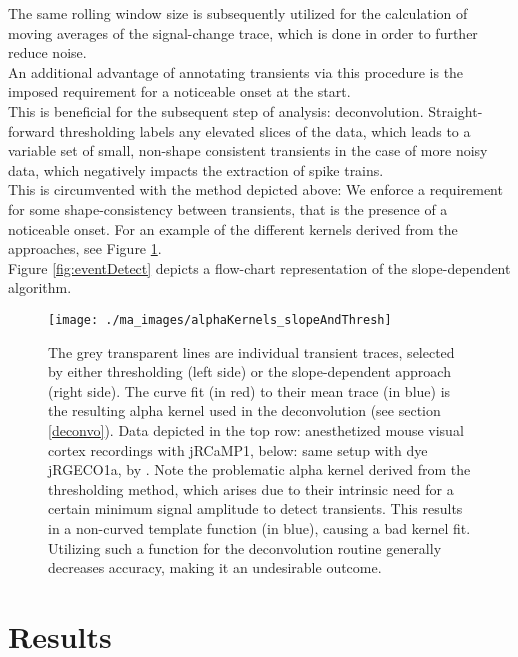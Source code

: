 \documentclass[titlepage]{article}
\begin{document}
The same rolling window size is subsequently utilized for the calculation of moving averages of the signal-change trace, which is done in order to further reduce noise.\\
An additional advantage of annotating transients via this procedure is the imposed requirement for a noticeable onset at the start.\\
This is beneficial for the subsequent step of analysis: deconvolution.
Straight-forward thresholding labels any elevated slices of the data, which leads to a variable set of small, non-shape consistent transients in the case of more noisy data, which negatively impacts the extraction of spike trains.\\
This is circumvented with the method depicted above: We enforce a requirement for some shape-consistency between transients, that is the presence of a noticeable onset. For an example of the different kernels derived from the approaches, see Figure \ref{fig:alphaKernels_slopeAndThresh}.\\
Figure \ref{fig:eventDetect} depicts a flow-chart representation of the slope-dependent algorithm.
\begin{figure}[h]
\centering
\texttt{[image: ./ma\_images/alphaKernels\_slopeAndThresh]}
\caption{The grey transparent lines are individual transient traces, selected by either thresholding (left side) or the slope-dependent approach (right side).\newline
The curve fit (in red) to their mean trace (in blue) is the resulting alpha kernel used in the deconvolution (see section \ref{deconvo}).\newline
Data depicted in the top row: anesthetized mouse visual cortex recordings with jRCaMP1, below: same setup with dye jRGECO1a, by \citeauthor{dana_sensitive_2016} \cite{dana_sensitive_2016}. Note the problematic alpha kernel derived from the thresholding method, which arises due to their intrinsic need for a certain minimum signal amplitude to detect transients. This results in a non-curved template function (in blue), causing a bad kernel fit. Utilizing such a function for the deconvolution routine generally decreases accuracy, making it an undesirable outcome.
}
\label{fig:alphaKernels_slopeAndThresh}
\end{figure}

\section{Results}
\end{document}
